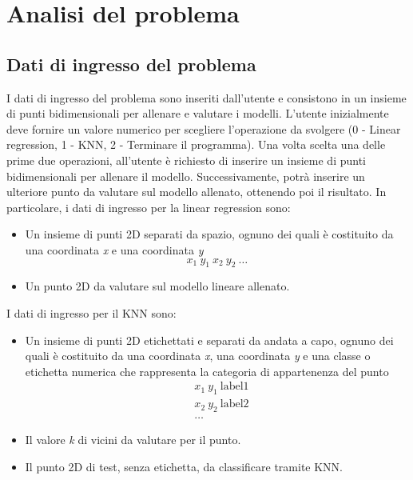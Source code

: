 \documentclass[11pt]{article}
\theoremstyle{definition}
\begin{document}
\newpage

\section{Analisi del problema}

\subsection{Dati di ingresso del problema}
I dati di ingresso del problema sono inseriti dall'utente e consistono in un insieme di punti bidimensionali per allenare e valutare i modelli. L'utente inizialmente deve fornire un valore numerico per scegliere l'operazione da svolgere (0 - Linear regression, 1 - KNN, 2 - Terminare il programma). Una volta scelta una delle prime due operazioni, all'utente è richiesto di inserire un insieme di punti bidimensionali per allenare il modello. Successivamente, potrà inserire un ulteriore punto da valutare sul modello allenato, ottenendo poi il risultato. In particolare, i dati di ingresso per la linear regression sono:
\begin{itemize}
\item Un insieme di punti 2D separati da spazio, ognuno dei quali è costituito da una coordinata \textit{x} e una coordinata \textit{y} 
$$x_1 \ y_1 \ x_2 \ y_2 \ \dots $$
\item Un punto 2D da valutare sul modello lineare allenato.
\end{itemize}
I dati di ingresso per il KNN sono:
\begin{itemize}
\item Un insieme di punti 2D etichettati e separati da andata a capo, ognuno dei quali è costituito da una coordinata \textit{x}, una coordinata \textit{y} e una classe o etichetta numerica che rappresenta la categoria di appartenenza del punto 
\begin{align*}
&x_1 \ y_1 \ \text{label1}\\
&x_2 \ y_2 \ \text{label2}\\
&\dots
\end{align*}
\item Il valore \textit{k} di vicini da valutare per il punto.
\item Il punto 2D di test, senza etichetta, da classificare tramite KNN.
\end{itemize}
\end{document}

